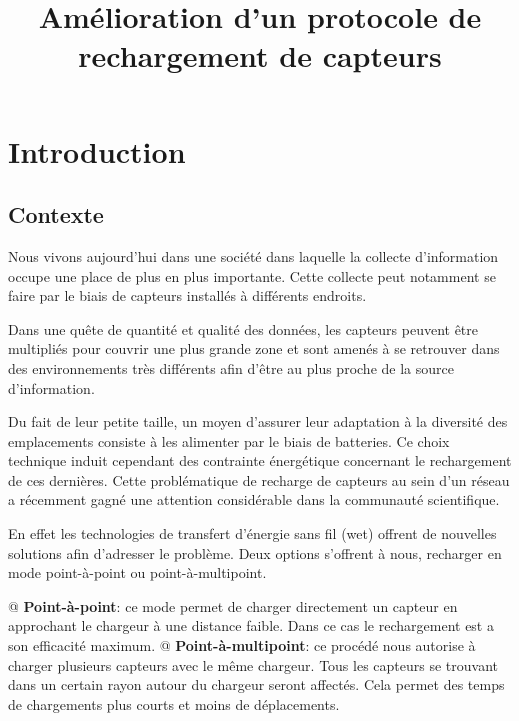 \documentclass[final]{polytech/polytech}
\title{Amélioration d'un protocole de rechargement de capteurs}
\begin{document}
\chapter{Introduction}
	\section{Contexte}
		Nous vivons aujourd'hui dans une société dans laquelle la collecte d'information occupe une place de plus en plus importante.
		Cette collecte peut notamment se faire par le biais de capteurs installés à différents endroits.
		
		
		Dans une quête de quantité et qualité des données, les capteurs peuvent être multipliés pour couvrir une plus grande zone et sont amenés à se retrouver dans des environnements très différents afin d'être au plus proche de la source d'information.
		
		Du fait de leur petite taille, un moyen d'assurer leur adaptation à la diversité des emplacements consiste à les alimenter par le biais de batteries.
		Ce choix technique induit cependant des contrainte énergétique concernant le rechargement de ces dernières.
		Cette problématique de recharge de capteurs au sein d'un réseau a récemment gagné une attention considérable dans la communauté scientifique.
		
		En effet les technologies de transfert d'énergie sans fil (\gls{wet}) offrent de nouvelles solutions afin d'adresser le problème.
		Deux options s'offrent à nous, recharger en mode point-à-point ou point-à-multipoint.
		\begin{easylist}[itemize]
			@ \textbf{Point-à-point}: ce mode permet de charger directement un capteur en approchant le chargeur à une distance faible.
			Dans ce cas le rechargement est a son efficacité maximum.
			@ \textbf{Point-à-multipoint}: ce procédé nous autorise à charger plusieurs capteurs avec le même chargeur.
			Tous les capteurs se trouvant dans un certain rayon autour du chargeur seront affectés.
			Cela permet des temps de chargements plus courts et moins de déplacements.
		\end{easylist}
	
\end{document}
